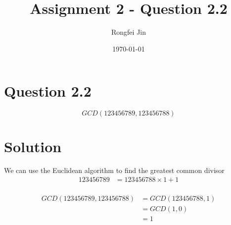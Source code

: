 \documentclass{article}
\author{Rongfei Jin}
\title{Assignment 2 - Question 2.2}
\date{\today}
\begin{document}
\section{Question 2.2}
$$
GCD(123456789,123456788)
$$

\section{Solution}
We can use the Euclidean algorithm to find the greatest common divisor 
\begin{align*}
    123456789 &= 123456788 \times 1 + 1 \\
\end{align*}

\begin{align*}
GCD(123456789, 123456788) &= GCD(123456788, 1) \\
&= GCD(1,0) \\
&= 1
\end{align*}
\end{document}
